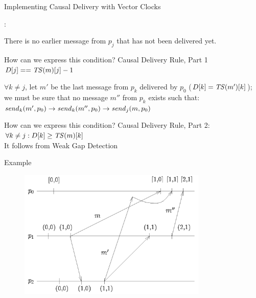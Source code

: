 

\begin{frame}{Implementing Causal Delivery with Vector Clocks}

:

\BIL

\item There is no earlier message from $p_j$ that has not been delivered yet.
\begin{overprint}
 \alert{How can we express this condition?}
  \alert{Causal Delivery Rule, Part 1}  $D[j] == \mathit{TS}(m)[j] -1$
\end{overprint}

\item $\forall k \neq j$, let $m'$ be the last message from $p_k$ delivered by $p_0$ ($D[k] = \mathit{TS}(m')[k]$); 
we must be sure that no message $m''$ from $p_k$ exists such that:
$
\mathit{send}_k(m',p_0) \rightarrow \mathit{send}_k(m'',p_0) \rightarrow \mathit{send}_j(m,p_0)
$
\begin{overprint}
  \alert{How can we express this condition?}
\alert{Causal Delivery Rule, Part 2}: $\forall k \neq j: D[k] \geq \mathit{TS}(m)[k]$\\
It follows from Weak Gap Detection
\end{overprint}

\EIL

\end{frame}

\begin{frame}{Example}
\begin{figure} 
\includegraphics[width=9cm]{figs/03/figure-8}
\end{figure}
\end{frame}

